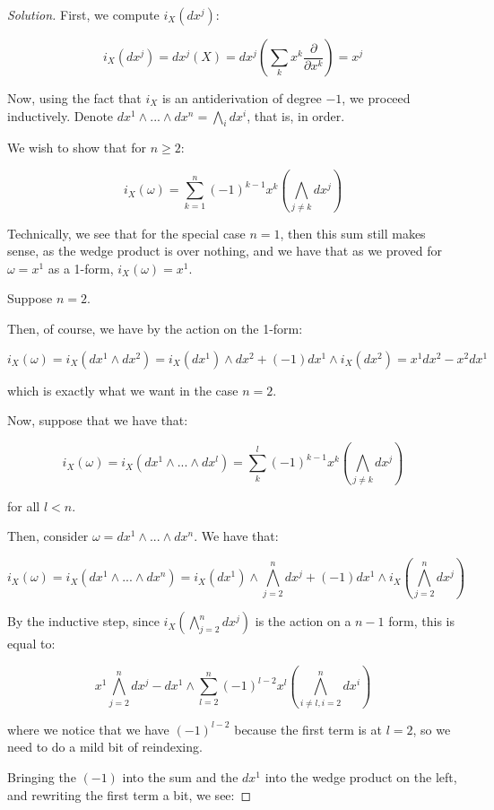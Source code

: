 \documentclass[10pt]{article}
\theoremstyle{nonumberplain}%
\begin{document}
\begin{proof}[Solution]

First, we compute $i_X(dx^j)$:

$$ i_X(dx^j) = dx^j(X) = dx^j\left( \sum_{k} x^k \frac{\partial}{\partial x^k} \right) = x^j $$

Now, using the fact that $i_X$ is an antiderivation of degree $-1$, we proceed inductively. Denote $dx^1 \wedge ... \wedge dx^n = \bigwedge_{i} dx^i$, that is, in order.

We wish to show that for $n \geq 2$:

$$ i_X(\omega) =  \sum_{k=1}^n (-1)^{k-1} x^k \left(\bigwedge_{j\not=k} dx^j \right) $$

Technically, we see that for the special case $n=1$, then this sum still makes sense, as the wedge product is over nothing, and we have that as we proved for $\omega = x^1$ as a 1-form, $i_X(\omega) = x^1$.

Suppose $n = 2$.

Then, of course, we have by the action on the 1-form:

$$i_X (\omega) = i_X(dx^1 \wedge dx^2) = i_X(dx^1) \wedge dx^2 + (-1) dx^1 \wedge i_X(dx^2) = x^1 dx^2 - x^2 dx^1$$

which is exactly what we want in the case $n=2$.

Now, suppose that we have that:

$$ i_X(\omega) = i_X(dx^1 \wedge ... \wedge dx^l ) = \sum_k^l (-1)^{k-1} x^k \left(\bigwedge_{j\not=k} dx^j \right)$$

for all $l < n$.

Then, consider $\omega = dx^1 \wedge ... \wedge dx^n$. We have that:

$$ i_X(\omega) = i_X(dx^1 \wedge ... \wedge dx^n) = i_X(dx^1) \wedge \bigwedge_{j=2}^n dx^j  + (-1)dx^1 \wedge i_X\left( \bigwedge_{j=2}^n dx^j \right) $$

By the inductive step, since $i_X\left( \bigwedge_{j=2}^n dx^j \right)$ is the action on a $n-1$ form, this is equal to:

$$ x^1  \bigwedge_{j=2}^n dx^j - dx^1 \wedge  \sum_{l=2}^n (-1)^{l-2} x^l \left(\bigwedge_{i\not=l, i=2}^n dx^i \right)$$

where we notice that we have $(-1)^{l-2}$ because the first term is at $l=2$, so we need to do a mild bit of reindexing.

Bringing the $(-1)$ into the sum and the $dx^1$ into the wedge product on the left, and rewriting the first term a bit, we see:


\end{proof}
\end{document}
